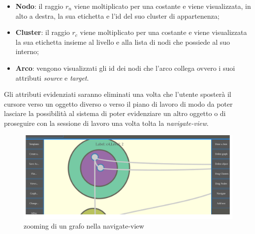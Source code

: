 {\begin{itemize}
	\item \textbf{Nodo}: il raggio $r_n$ viene moltiplicato per una costante e viene visualizzata, in alto a destra, la sua etichetta e l'id del suo cluster di appartenenza;
	\item \textbf{Cluster}: il raggio $r_c$ viene moltiplicato per una costante e viene visualizzata la sua etichetta insieme al livello e alla lista di nodi che possiede al suo interno;
	\item \textbf{Arco}: vengono visualizzati gli id dei nodi che l'arco collega ovvero i suoi attributi \textit{source} e \textit{target}.
\end{itemize}
Gli attributi evidenziati saranno eliminati una volta che l'utente sposterà il cursore verso un oggetto diverso o verso il piano di lavoro di modo da poter lasciare la possibilità al sistema di poter evidenziare un altro oggetto o di proseguire con la sessione di lavoro una volta tolta la \textit{navigate-view}.
\begin{figure}[!htb]
	\begin{center}
		\includegraphics[width=1 \linewidth]{figure/zoomGraph}
	\end{center}
	\caption{zooming di un grafo nella navigate-view\label{fig:zoomGraph}}
\end{figure}
}

